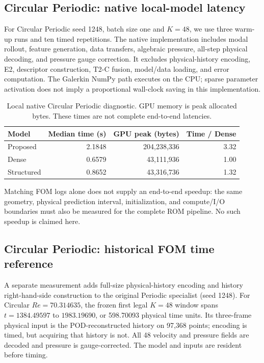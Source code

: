 \subsection{Circular Periodic: native local-model latency}
For Circular Periodic seed 1248, batch size one and $K=48$, we use three
warm-up runs and ten timed repetitions. The native implementation
includes modal rollout, feature generation, data transfers, algebraic
pressure, all-step physical decoding, and pressure gauge correction.
It excludes physical-history encoding, E2, descriptor construction,
T2-C fusion, model/data loading, and error computation. The Galerkin
NumPy path executes on the CPU; sparse parameter activation does not
imply a proportional wall-clock saving in this implementation.

\begin{table}[H]
\centering
\caption{Local native Circular Periodic diagnostic. GPU memory is peak
allocated bytes. These times are not complete end-to-end latencies.}
\label{tab:local_latency}
\small
\begin{tabular}{@{}lrrr@{}}
\toprule
Model & Median time (s) & GPU peak (bytes) & Time / Dense\\
\midrule
Proposed & 2.1848 & 204,238,336 & 3.32\\
Dense & 0.6579 & 43,111,936 & 1.00\\
Structured & 0.8652 & 43,316,736 & 1.32\\
\bottomrule
\end{tabular}
\end{table}

Matching FOM logs alone does not supply an end-to-end speedup: the same
geometry, physical prediction interval, initialization, and compute/I/O
boundaries must also be measured for the complete ROM pipeline. No such
speedup is claimed here.

\subsection{Circular Periodic: historical FOM time reference}
A separate measurement adds full-size physical-history encoding and
history right-hand-side construction to the original Periodic specialist
(seed 1248). For Circular $Re=70.314635$, the frozen first legal $K=48$
window spans $t=1384.49597$ to $1983.19690$, or 598.70093 physical time
units. Its three-frame physical input is the POD-reconstructed history
on 97,368 points; encoding is timed, but acquiring that history is not.
All 48 velocity and pressure fields are decoded and pressure is
gauge-corrected. The model and inputs are resident before timing.

